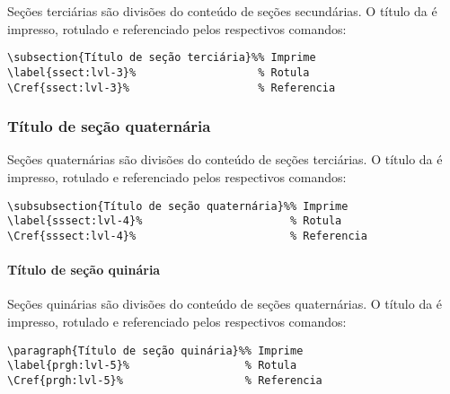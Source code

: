 Seções terciárias são divisões do conteúdo de seções secundárias.
O título da  é impresso, rotulado e referenciado pelos respectivos comandos:

\begin{snugshade}
\begin{Verbatim}
\subsection{Título de seção terciária}%% Imprime
\label{ssect:lvl-3}%                   % Rotula
\Cref{ssect:lvl-3}%                    % Referencia
\end{Verbatim}
\end{snugshade}

\subsubsection{Título de seção quaternária}%
\label{sssect:lvl-4}

Seções quaternárias são divisões do conteúdo de seções terciárias.
O título da  é impresso, rotulado e referenciado pelos respectivos comandos:

\begin{snugshade}
\begin{Verbatim}
\subsubsection{Título de seção quaternária}%% Imprime
\label{sssect:lvl-4}%                       % Rotula
\Cref{sssect:lvl-4}%                        % Referencia
\end{Verbatim}
\end{snugshade}

\paragraph{Título de seção quinária}%
\label{prgh:lvl-5}

Seções quinárias são divisões do conteúdo de seções quaternárias.
O título da  é impresso, rotulado e referenciado pelos respectivos comandos:

\begin{snugshade}
\begin{Verbatim}
\paragraph{Título de seção quinária}%% Imprime
\label{prgh:lvl-5}%                  % Rotula
\Cref{prgh:lvl-5}%                   % Referencia
\end{Verbatim}
\end{snugshade}

